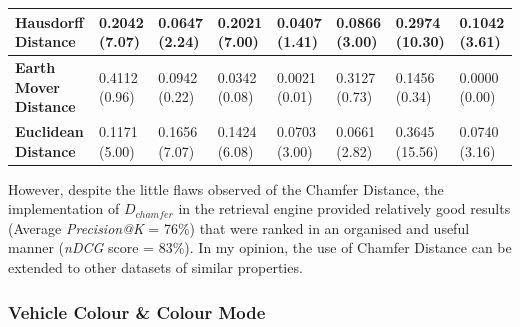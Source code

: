 \begin{landscape}
\begin{table}[]
{\begin{tabular}{|l||l|l|l|l|l|l|l|}
\textbf{Hausdorff Distance} & 0.2042 (7.07) & 0.0647 (2.24) & 0.2021 (7.00) & 0.0407 (1.41) & 0.0866 (3.00) & 0.2974 (10.30) & 0.1042 (3.61) \\ \hline
\textbf{Earth Mover Distance} & 0.4112 (0.96) & 0.0942 (0.22) & 0.0342 (0.08) & 0.0021 (0.01) & 0.3127 (0.73) & 0.1456 (0.34) & 0.0000 (0.00) \\ \hline
\textbf{Euclidean Distance} & 0.1171 (5.00) & 0.1656 (7.07) & 0.1424 (6.08) & 0.0703 (3.00) & 0.0661 (2.82) & 0.3645 (15.56) & 0.0740 (3.16) \\ \hline
\end{tabular}%
}
\label{table:DistanceCompare}
\end{table}
\end{landscape}

However, despite the little flaws observed of the Chamfer Distance, the implementation of $D_{chamfer}$ in the retrieval engine provided relatively good results (Average \textit{Precision@K} = 76\%) that were ranked in an organised and useful manner (\textit{nDCG} score = 83\%). In my opinion, the use of Chamfer Distance can be extended to other datasets of similar properties.

\vspace{1em}
\subsubsection{Vehicle Colour \& Colour Mode}
\label{subsec:vehiclecolourchamferdistanceexperiment}

